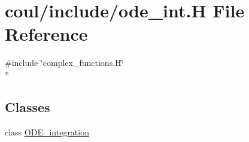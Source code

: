 \hypertarget{ode__int_8H}{\section{coul/include/ode\-\_\-int.H File Reference}
\label{ode__int_8H}
}
{\ttfamily \#include \char`\"{}complex\-\_\-functions.\-H\char`\"{}}\\*
\subsection*{Classes}
\begin{DoxyCompactItemize}
\item 
class \hyperlink{classODE__integration}{O\-D\-E\-\_\-integration}
\end{DoxyCompactItemize}
